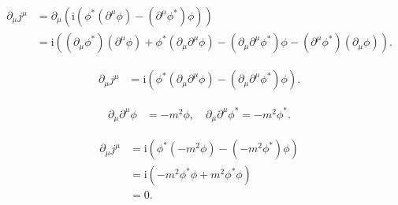 
\begin{align*}
\partial_\mu j^\mu &= \partial_\mu \left( \mathrm{i} \left( \phi^* \left( \partial^\mu \phi \right) - \left( \partial^\mu \phi^* \right) \phi \right) \right) \\
&= \mathrm{i} \left( \left( \partial_\mu \phi^* \right) \left( \partial^\mu \phi \right) + \phi^* \left( \partial_\mu \partial^\mu \phi \right) - \left( \partial_\mu \partial^\mu \phi^* \right) \phi - \left( \partial^\mu \phi^* \right) \left( \partial_\mu \phi \right) \right).
\end{align*}


\begin{align*}
\partial_\mu j^\mu &= \mathrm{i} \left( \phi^* \left( \partial_\mu \partial^\mu \phi \right) - \left( \partial_\mu \partial^\mu \phi^* \right) \phi \right).
\end{align*}


\begin{align*}
\partial_\mu \partial^\mu \phi &= -m^2 \phi, \quad \partial_\mu \partial^\mu \phi^* = -m^2 \phi^*.
\end{align*}


\begin{align*}
\partial_\mu j^\mu &= \mathrm{i} \left( \phi^* (-m^2 \phi) - (-m^2 \phi^*) \phi \right) \\
&= \mathrm{i} \left( -m^2 \phi^* \phi + m^2 \phi^* \phi \right) \\
&= 0.
\end{align*}



